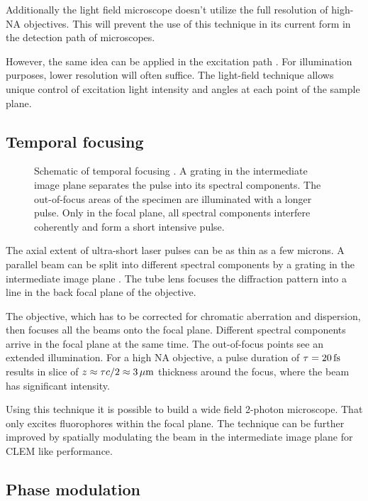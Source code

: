 Additionally the light field microscope doesn't utilize the full
resolution of high-NA objectives. This will prevent the use of this
technique in its current form in the detection path of microscopes.

However, the same idea can be applied in the excitation path
\citep{Levoy2009}. For illumination purposes, lower resolution will
often suffice. The light-field technique allows unique control of
excitation light intensity and angles at each point of the sample
plane.

\subsection{Temporal focusing}
\begin{figure}[!hbt]
  \centering
  
  \caption{Schematic of temporal focusing \citep[inspired
    from][]{Oron2005}. A grating in the intermediate image plane
    separates the pulse into its spectral components. The out-of-focus
    areas of the specimen are illuminated with a longer pulse. Only in
    the focal plane, all spectral components interfere coherently and
    form a short intensive pulse.}
  \label{fig:oron}
\end{figure}
The axial extent of ultra-short laser pulses can be as thin as a few
microns. A parallel beam can be split into different spectral
components by a grating in the intermediate image plane
\citep{Oron2005}. The tube lens focuses the diffraction pattern into a
line in the back focal plane of the objective.

The objective, which has to be corrected for chromatic aberration and
dispersion, then focuses all the beams onto the focal plane. Different
spectral components arrive in the focal plane at the same time. The
out-of-focus points see an extended illumination. For a high NA
objective, a pulse duration of $\tau=\unit[20]{fs}$ results in slice
of $z\approx\tau c/2\approx\unit[3]{\mu m}$ thickness around the
focus, where the beam has significant intensity.

Using this technique it is possible to build a wide field 2-photon
microscope. That only excites fluorophores within the focal plane. The
technique can be further improved by spatially modulating the beam
in the intermediate image plane for CLEM like performance.

\subsection{Phase modulation}
